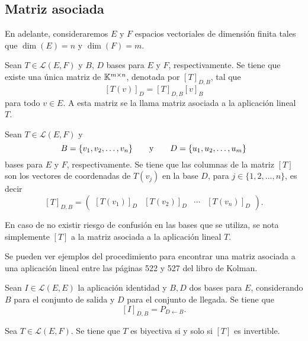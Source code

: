 \documentclass[a4,11pt]{aleph-notas}
\begin{document}
\subsection{Matriz asociada}

En adelante, consideraremos $E$ y $F$ espacios vectoriales de dimensión finita tales que $\dim(E)=n$ y $\dim(F)=m$.

\begin{defi}
    Sean $T \in \mathcal{L}(E,F)$ y $B$, $D$ bases para $E$ y $F$, respectivamente. Se tiene que existe una única matriz de $\Mat[\K]{m}{n}$, denotada por $[T]_{D,B}$, tal que
    \[
        [T(v)]_{D} = [T]_{D,B} [v]_{B}
    \]
    para todo $v\in E$. A esta matriz se la llama matriz asociada a la aplicación lineal $T$.
\end{defi}


\begin{teo}
    Sean $T \in \mathcal{L}(E,F)$ y 
    \[
        B = \{v_1,v_2,\ldots,v_n\}
        \texty
        D = \{u_1,u_2,\ldots,u_m\}
    \]
    bases para $E$ y $F$, respectivamente. Se tiene que las columnas de la matriz $[T]$ son los vectores de coordenadas de $T(v_j)$ en la base $D$, para $j\in\{1,2,\ldots,n\}$, es decir
    \[
        [T]_{D,B} = \begin{pmatrix}
            [T(v_1)]_D & [T(v_2)]_D & \cdots & [T(v_n)]_D
        \end{pmatrix}.
    \]
\end{teo}

\begin{advertencia}
    En caso de no existir riesgo de confusión en las bases que se utiliza, se nota simplemente $[T]$ a la matriz asociada a la aplicación lineal $T$. 
\end{advertencia}


Se pueden ver ejemplos del procedimiento para encontrar una matriz asociada a una aplicación lineal entre las páginas 522 y 527 del libro de Kolman.


\begin{teo}
    Sean $I \in \mathcal{L}(E,E)$ la aplicación identidad y $B,D$ dos bases para $E$, considerando $B$ para el conjunto de salida y $D$ para el conjunto de llegada. Se tiene que
    \[
        [I]_{D,B} = P_{D\leftarrow B}.
    \]
\end{teo}



\begin{teo}
    Sea $T \in \mathcal{L}(E,F)$. Se tiene que $T$ es biyectiva si y solo si $[T]$ es invertible.
\end{teo}
\end{document}
